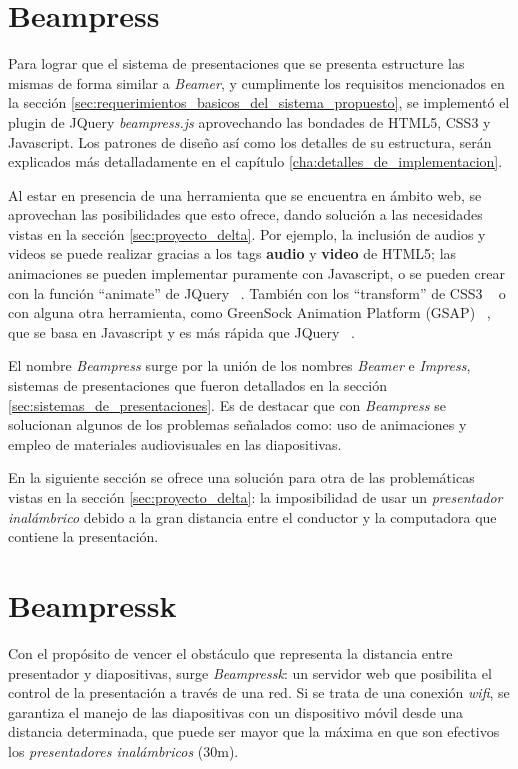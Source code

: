 	\section{Beampress} %
	\label{sec:beampress}
		Para lograr que el sistema de presentaciones que se presenta estructure las mismas de forma similar a \textit{Beamer}, y cumplimente los requisitos mencionados en la sección \ref{sec:requerimientos_basicos_del_sistema_propuesto}, se implementó el plugin de JQuery \textit{beampress.js} aprovechando las bondades de HTML5, CSS3 y Javascript. Los patrones de diseño así como los detalles de su estructura, serán explicados más detalladamente en el capítulo \ref{cha:detalles_de_implementacion}.


		Al estar en presencia de una herramienta que se encuentra en ámbito web, se aprovechan las posibilidades que esto ofrece, dando solución a las necesidades vistas en la sección \ref{sec:proyecto_delta}. Por ejemplo, la inclusión de audios y videos se puede realizar gracias a los tags \textbf{audio} y \textbf{video} de HTML5; las animaciones se pueden implementar puramente con Javascript, o se pueden crear con la función ``animate'' de JQuery ~\cite{animate}. También con los ``transform'' de CSS3 ~\cite{csstransform} o con alguna otra herramienta, como GreenSock Animation Platform (GSAP) ~\cite{gsap}, que se basa en Javascript y es más rápida que JQuery ~\cite{jquery}. 


		El nombre \textit{Beampress} surge por la unión de los nombres \textit{Beamer} e \textit{Impress}, sistemas de presentaciones que fueron detallados en la sección \ref{sec:sistemas_de_presentaciones}. Es de destacar que con \textit{Beampress} se solucionan algunos de los problemas señalados como: uso de animaciones y empleo de materiales audiovisuales en las diapositivas.	

	En la siguiente sección se ofrece una solución para otra de las problemáticas vistas en la sección \ref{sec:proyecto_delta}: la imposibilidad de usar un \textit{presentador inalámbrico} debido a la gran distancia entre el conductor y la computadora que contiene la presentación.
	
	\section{Beampressk} %
	\label{sec:beampressk}
		Con el propósito de vencer el obstáculo que representa la distancia entre presentador y diapositivas, surge \textit{Beampressk}: un servidor web que posibilita el control de la presentación a través de una red. Si se trata de una conexión \textit{wifi}, se garantiza el manejo de las diapositivas con un dispositivo móvil desde una distancia determinada, que puede ser mayor que la máxima en que son efectivos los \textit{presentadores inalámbricos} (30m).

